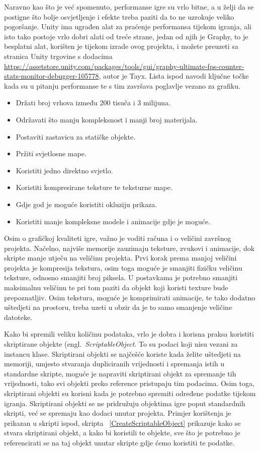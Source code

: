 Naravno kao što je već spomenuto, performanse igre su vrlo bitne, a u želji da se postigne što bolje osvjetljenje i efekte treba paziti da to ne uzrokuje veliko pogoršanje. 
Unity ima ugrađen alat za praćenje performansa tijekom igranja, ali isto tako postoje vrlo dobri alati od treće strane, jedan od njih je Graphy, to je besplatni alat, korišten je tijekom izrade ovog projekta, i možete preuzeti sa stranica Unity trgovine s dodacima \url{https://assetstore.unity.com/packages/tools/gui/graphy-ultimate-fps-counter-stats-monitor-debugger-105778}, autor je Tayx.
Lista ispod navodi ključne točke kada su u pitanju performanse te s tim završava poglavlje vezano za grafiku.
\begin{itemize}
  \item Držati broj vrhova između 200 tisuča i 3 milijuna.
  \item Održavati što manju kompleksnost i manji broj materijala.
  \item Postaviti zastavicu za statičke objekte.
  \item Pržiti svjetlosne mape.
  \item Koristiti jedno direktno svjetlo.
  \item Koristiti kompresirane teksture te teksturne mape.
  \item Gdje god je moguće koristiti okluziju prikaza.
  \item Koristiti manje kompleksne modele i animacije gdje je moguće.
\end{itemize}

Osim o grafičkoj kvaliteti igre, važno je voditi računa i o veličini završnog projekta. Načelno, najviše memorije zauzimaju teksture, zvukovi i animacije, dok skripte manje utječu na veličinu projekta. 
Prvi korak prema manjoj veličini projekta je kompresija tekstura, osim toga moguće je smanjiti fizičku veličinu teksture, odnosno smanjiti broj piksela. U postavkama je potrebno smanjiti maksimalnu veličinu te pri tom paziti da objekt koji koristi texture bude prepoznatljiv.
Osim tekstura, moguće je komprimirati animacije, te tako dodatno uštedjeti na prostoru, treba uzeti u obzir da je to samo smanjenje veličine datoteke.

Kako bi spremili veliku količinu podataka, vrlo je dobra i korisna praksa koristiti skriptirane objekte (engl.~\textit{ScriptableObject}. To su podaci koji nisu vezani za instancu klase. Skriptirani objekti se najčešće koriste kada želite uštedjeti na memoriji, umjesto stvaranja dupliciranih vrijednosti i spremanja istih u standardne skripte, moguće je napraviti skriptirani objekt za spremanje tih vrijednosti, tako svi objekti preko reference pristupaju tim podacima. Osim toga, skriptirani objekti su korisni kada je potrebno spremiti određene podatke tijekom igranja. Skriptirani objekti se ne pridružuju objektima igre poput standardnih skripti, već se spremaju kao dodaci unutar projekta.
Primjer korištenja je prikazan u skripti ispod, skripta ~\ref{CreateScriptableObject} prikazuje kako se stvara skriptirani objekt, a kako bi koristili te objekte, sve što je potrebno je referencirati se na taj objekt unutar skripte gdje ćemo koristiti te podatke.

